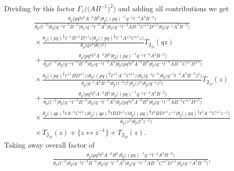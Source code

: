 \documentclass[a4paper,12pt]{article}
\begin{document}
Dividing by this factor $\Gamma_e\big(\big(A B^{-1}\big)^2\big)$ and adding all contributions we get
\begin{gather*}
\frac{\theta_p\big(pq^2t^2A^{-2}B^2\big)
\theta_p\big((pq)^{-1}q^{-1}t^{-4}A^2B^{-2}\big)}
{\theta_p\big(t^{-2}\big)\theta_p\big(q^{-1}t^{-2}B^{-2}\big)\theta_p\big(q^{-1}t^{-2}A^2\big)
\theta_p\big(q^{-1}t^{-2}AB^{-1}C^{\pm1}D^{\pm1}\big)
\theta_p\big(q^{-1}A^2B^{-2}\big)}\\
{}\times \frac{\theta_p\big((pq)^\frac{1}{2}t^{-1}B^{\pm1}D^{\pm1}z\big)
\theta_p\big((pq)^\frac{1}{2}t^{-1}A^{\pm1}C^{\pm1}z\big)}{\theta_p\big(qz^2\big)\theta\big(z^2\big)}T_{{\mathfrak J}_D}(qz)\\
{}+ \frac{\theta_p\big(pq^2t^2A^{-2}B^2\big) \theta_p\big((pq)^{-1}q^{-1}t^{-4}A^2B^{-2}\big)}
{\theta_p\big(t^{-2}\big)\theta_p\big(q^{-1}t^{-2}B^{-2}\big)\theta_p\big(q^{-1}t^{-2}A^2\big)\theta_p\big(pq^2t^4A^{-2}B^2\big)
\theta_p\big(q^{-1}t^{-2}AB^{-1}C^{\pm1}D^{\pm1}\big)}\\
{}\times\frac{\theta_p\big((pq)^\frac{1}{2}t^{\pm1}BD^{\pm1}z\big)
\theta_p\big((pq)^\frac{1}{2}t^{\pm1}A^{-1}C^{\pm1}z\big)
\theta_p\big(q^{-1}t^{-4}\big)\theta_p\big(q^{-1}t^{-4}A^2B^{-2}z^2\big)}
{\theta_p\big(q^{-1}A^2B^{-2}\big)\theta_p\big(t^{-4}z^2\big)\theta_p\big(z^2\big)\theta_p\big(q^{-1}z^2\big)}T_{{\mathfrak J}_D}(z)\\
{}+ \frac{\theta_p\big(pq^2t^2A^{-2}B^2\big)
\theta_p\big((pq)^{-1}q^{-1}t^{-4}A^2B^{-2}\big)}
{\theta_p\big(t^{-2}\big)\theta_p\big(q^{-1}t^{-2}B^{-2}\big)\theta_p\big(q^{-1}t^{-2}A^2\big)\theta_p\big(pq^2t^4A^{-2}B^2\big)
\theta_p\big(q^{-1}t^{-2}AB^{-1}C^{\pm1}D^{\pm1}\big)}\\
{}\times\frac{\theta_p\big((q p)^{\frac12 }t A^{-1} C^{\pm1}z\big)
\theta_p\big((q p)^{\frac12 }t B D^{\pm1}z\big)
\theta_p\big((pq)^\frac{1}{2}t^3B D^{\pm1} z^{-1}\big)
\theta_p\big((pq)^\frac{1}{2}t^3 A^{-1} C^{\pm1} z^{-1}\big)}
{\theta_p\big(z^2\big)\theta_p\big(t^4z^{-2}\big)}\\
{}\times T_{{\mathfrak J}_D}(z)
+ \big\{z\leftrightarrow z^{-1}\big\} + T_{{\mathfrak J}_D}(z) .
\end{gather*}
Taking away overall factor of
\begin{gather*}
 \frac{\theta_p\big(pq^2t^2A^{-2}B^2\big)\theta_p\big((pq)^{-1}q^{-1}t^{-4}A^2B^{-2}\big)}
{\theta_p\big(t^{-2}\big)\theta_p\big(q^{-1}t^{-2}B^{-2}\big)\theta_p\big(q^{-1}t^{-2}A^2\big)
\theta_p\big(q^{-1}t^{-2}AB^{-1}C^{\pm1}D^{\pm1}\big) \theta_p\big(q^{-1}A^2B^{-2}\big)} ,
\end{gather*}
\end{document}
